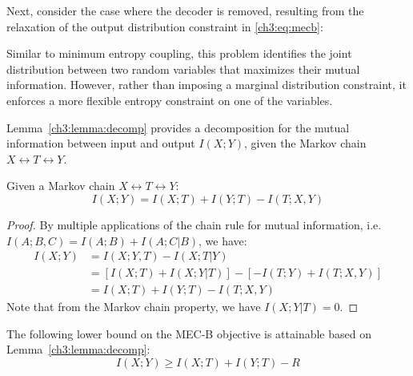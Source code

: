 Next, consider the case where the decoder is removed, resulting from the relaxation of the output distribution constraint in \eqref{ch3:eq:mecb}:


Similar to minimum entropy coupling, this problem identifies the joint distribution between two random variables that maximizes their mutual information. However, rather than imposing a marginal distribution constraint, it enforces a more flexible entropy constraint on one of the variables.


Lemma~\ref{ch3:lemma:decomp} provides a decomposition for the mutual information between input and output $I(X;Y)$, given the Markov chain $X \leftrightarrow T \leftrightarrow Y$.
 
\begin{lemma} \label{ch3:lemma:decomp}
    Given a Markov chain $X \leftrightarrow T \leftrightarrow Y$:
    \begin{equation}\label{ch3:eq:Idecomp}
        I(X;Y) = I(X;T) + I(Y;T) - I(T; X,Y)
    \end{equation}
\end{lemma}
\begin{proof}
By multiple applications of the chain rule for mutual information, i.e.  $I(A;B,C)=I(A;B)+I(A;C|B)$, we have:
\begin{align}
    I(X;Y) &= I(X;Y,T) - I(X;T|Y) \\
    &= [I(X; T) + I(X; Y | T) ] - [ - I(T; Y) + I(T; X, Y) ] \\
    &= I(X;T) + I(Y;T) - I(T; X,Y)
\end{align}
Note that from the Markov chain property, we have $I(X; Y | T)=0$.
\end{proof}

The following lower bound on the MEC-B objective is attainable based on Lemma~\ref{ch3:lemma:decomp}:
\begin{equation}\label{ch3:eq:mecblb}
    I(X;Y) \geq I(X;T) + I(Y;T) - R
\end{equation}

